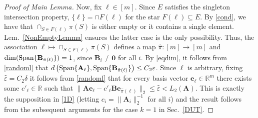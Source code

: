 \documentclass[9pt,twocolumn]{pnas-new}
\newtheorem{lemma}{Lemma}
\begin{document}
\begin{proof}[Proof of Main Lemma]
Now, fix $\ell \in [m]$. Since $E$ satisfies the singleton intersection property, $\{\ell\} = \cap F(\ell)$ for the star $F(\ell) \subseteq E$. By \eqref{cond}, we have that $\cap_{S \in F(\ell)} \pi(S)$ is either empty or it contains a single element. Lem.~\ref{NonEmptyLemma} ensures the latter case is the only possibility. Thus, the association $\ell \mapsto \cap_{S \in F(\ell)} \pi(S)$ defines a map $\hat \pi: [m] \to [m]$ and $\dim(\text{\rm Span}\{\mathbf{B}_{\hat \pi(\ell)}\}) = 1$, since $\mathbf{B}_i \neq \textbf{0}$ for all $i$. By \eqref{eqdim}, it follows from \eqref{randoml} that $d\left( \text{\rm Span}\{\mathbf{A}_\ell\}, \text{\rm Span}\{ \mathbf{B}_{\hat \pi(\ell)} \} \right) \leq C_2 \varepsilon$. Since $\ell$ is arbitrary, fixing $\hat \varepsilon = C_2\delta$ it follows from \eqref{randoml} that for every basis vector $\mathbf{e}_\ell \in \mathbb{R}^m$ there exists some $c'_\ell \in \mathbb{R}$ such that $\|\mathbf{A}\mathbf{e}_\ell - c'_\ell \mathbf{B}\mathbf{e}_{\hat \pi(\ell)}\|_2 \leq \hat \varepsilon < L_2(\mathbf{A})$. This is exactly the supposition in \eqref{1D} (letting $c_i = \|\mathbf{A}_i\|_2^{-1}$ for all $i$) and the result follows from the subsequent arguments for the case $k=1$ in Sec.~\ref{DUT}.
\end{proof}


%
%
\end{document}
